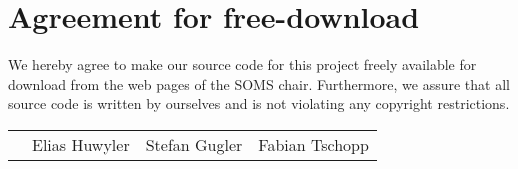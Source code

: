 \section*{Agreement for free-download}
\bigskip
\bigskip

\large We hereby agree to make our source code for this project freely available for download from the web pages of the SOMS chair. Furthermore, we assure that all source code is written by ourselves and is not violating any copyright restrictions.

\begin{center}
	\bigskip
	\bigskip
	\begin{tabular}{@{}p{2cm}@{}p{4cm}@{}@{}p{4cm}@{}@{}p{4cm}@{}}
		\begin{minipage}{3cm}
		
		\end{minipage}
		&
		\begin{minipage}{6cm}
			\large Elias Huwyler
		\end{minipage}
		&
		\begin{minipage}{6cm}
			\large Stefan Gugler
		\end{minipage}
		&
		\begin{minipage}{6cm}
			\large Fabian Tschopp
		\end{minipage}
	\end{tabular}
\end{center}